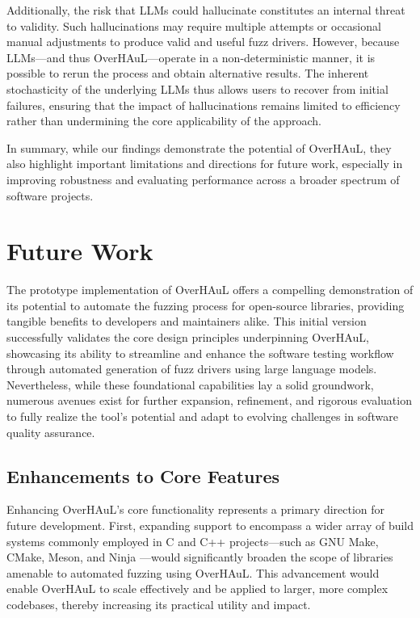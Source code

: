 \documentclass[
  a4paper,
]{scrreprt}
\theoremstyle{definition}
\theoremstyle{remark}
\begin{document}
Additionally, the risk that LLMs could hallucinate constitutes an
internal threat to validity. Such hallucinations may require multiple
attempts or occasional manual adjustments to produce valid and useful
fuzz drivers. However, because LLMs---and thus OverHAuL---operate in a
non-deterministic manner, it is possible to rerun the process and obtain
alternative results. The inherent stochasticity of the underlying LLMs
thus allows users to recover from initial failures, ensuring that the
impact of hallucinations remains limited to efficiency rather than
undermining the core applicability of the approach.

In summary, while our findings demonstrate the potential of OverHAuL,
they also highlight important limitations and directions for future
work, especially in improving robustness and evaluating performance
across a broader spectrum of software projects.


\chapter{Future Work}\label{future-work}

The prototype implementation of OverHAuL offers a compelling
demonstration of its potential to automate the fuzzing process for
open-source libraries, providing tangible benefits to developers and
maintainers alike. This initial version successfully validates the core
design principles underpinning OverHAuL, showcasing its ability to
streamline and enhance the software testing workflow through automated
generation of fuzz drivers using large language models. Nevertheless,
while these foundational capabilities lay a solid groundwork, numerous
avenues exist for further expansion, refinement, and rigorous evaluation
to fully realize the tool's potential and adapt to evolving challenges
in software quality assurance.

\section{Enhancements to Core
Features}\label{enhancements-to-core-features}

Enhancing OverHAuL's core functionality represents a primary direction
for future development. First, expanding support to encompass a wider
array of build systems commonly employed in C and C++ projects---such as
GNU Make, CMake, Meson, and Ninja
\autocite{cedilnik2000,feldman1979,martin2025,pakkanen2025}---would
significantly broaden the scope of libraries amenable to automated
fuzzing using OverHAuL. This advancement would enable OverHAuL to scale
effectively and be applied to larger, more complex codebases, thereby
increasing its practical utility and impact.
\end{document}
